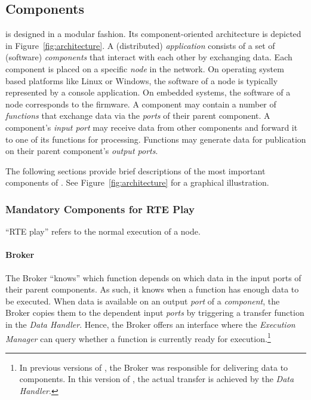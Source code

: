 \subsection{\xme Components}

\label{sec:core_components}
\xme is designed in a modular fashion. Its component-oriented architecture is depicted in Figure~\ref{fig:architecture}.
A (distributed) \emph{application} consists of a set of (software) \emph{components} that interact with each other by exchanging data.
Each component is placed on a specific \emph{node} in the network.
On operating system based platforms like Linux or Windows,
the software of a node is typically represented by a console application.
On embedded systems, the software of a node corresponds to the firmware.
A component may contain a number of \emph{functions} that exchange data via the \emph{ports} of their parent component.
A component's \emph{input port} may receive data from other components and forward it to one of its functions for processing.
Functions may generate data for publication on their parent component's \emph{output ports}.

The following sections provide brief descriptions of the most important components of \xme.
See Figure~\ref{fig:architecture} for a graphical illustration.



\subsubsection{Mandatory Components for RTE Play}

``RTE play'' refers to the normal execution of a \xme node.

\paragraph{Broker}
The Broker ``knows'' which function depends on which data in the input ports of their parent components.
As such, it knows when a function has enough data to be executed.
When data is available on an output \emph{port} of a \emph{component}, the Broker copies them to the dependent input \emph{ports} by triggering a transfer function in the \emph{Data Handler}.
Hence, the Broker offers an interface where the \emph{Execution Manager} can query whether a function is currently ready for execution.\footnote{%
	In previous versions of \xme, the Broker was responsible for delivering data to components.
	In this version of \xme, the actual transfer is achieved by the \emph{Data Handler}.
}

